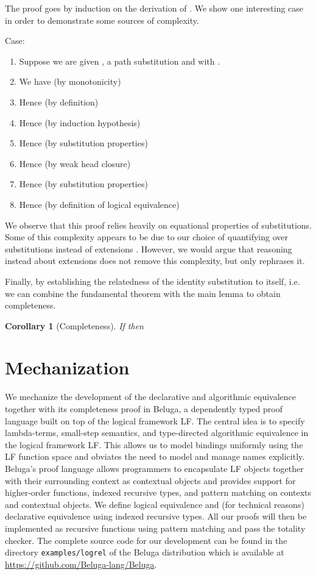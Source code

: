 \documentclass[copyright,creativecommons]{eptcs}
\newtheorem{corollary}[theorem]{Corollary}
\newenvironment{proof}[1][Proof]{\begin{trivlist}
\item[\hskip \labelsep {\bfseries #1}]}{\end{trivlist}}
\begin{document}
The proof goes by induction on the derivation of . We show one interesting case in order to demonstrate some sources
of complexity.

\begin{proof}
Case: 
\begin{enumerate}
\item Suppose we are given , a path substitution  and  with .
\item We have 
\hfill (by monotonicity)
\item Hence  \hfill  (by definition)
\item Hence  \hfill  (by induction hypothesis)
\item Hence  \hfill  (by substitution properties)
\item Hence  \hfill  (by weak head
  closure)
\item Hence  \hfill  (by substitution properties)
\item Hence  \hfill  (by definition of logical equivalence)
\end{enumerate}
\end{proof}

We observe that this proof relies heavily on equational properties of
substitutions. Some of this complexity appears to be due to our choice of
quantifying over substitutions  instead of
extensions . However,
we would argue that reasoning instead about extensions  does not remove this complexity, but only rephrases it.

Finally, by establishing the relatedness of the identity substitution to
itself, i.e.  we can combine the
fundamental theorem with the main lemma to obtain completeness.

\begin{corollary}[Completeness]
If  then 
\end{corollary}

\section{Mechanization}\label{sec:mechanization}
We mechanize the development of the declarative and algorithmic equivalence
together with its completeness proof in Beluga, a dependently typed proof
language built on top of the logical framework LF. The central idea is to
specify lambda-terms, small-step semantics, and type-directed
algorithmic equivalence in the logical framework LF. This allows us to model bindings uniformly using the LF
function space and obviates the need to model and manage names
explicitly. Beluga's proof language allows programmers to encapsulate LF objects
together with their surrounding context as contextual objects and provides
support for higher-order functions, indexed recursive types, and pattern
matching on contexts and contextual objects. We define logical
equivalence and (for technical reasons) declarative equivalence using
indexed recursive types. All our proofs will then be implemented as recursive
functions using pattern matching and pass the totality checker. The complete source code for our
development can be found in the directory \lstinline!examples/logrel! of the Beluga
distribution which is available at 
\url{https://github.com/Beluga-lang/Beluga}.
\end{document}
